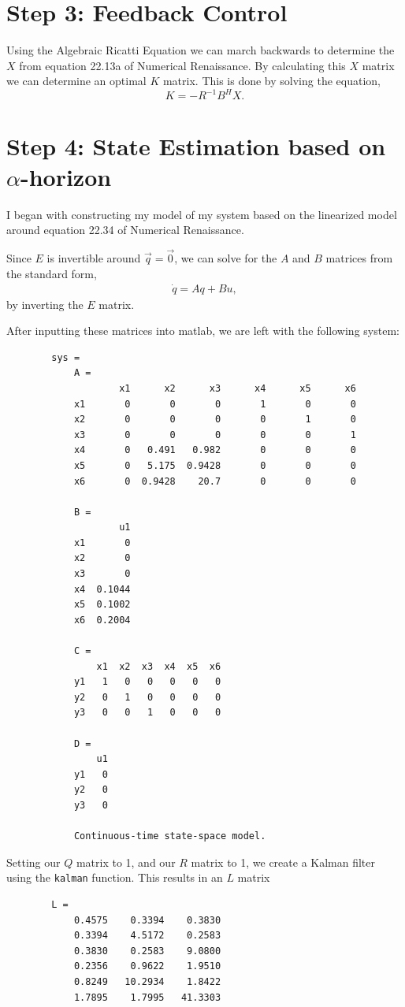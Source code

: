 \documentclass{article}
\theoremstyle{definition}
\begin{document}
    \section*{Step 3: Feedback Control}
    Using the Algebraic Ricatti Equation we can march backwards to determine the
    $X$ from equation 22.13a of Numerical Renaissance. By calculating this $X$ 
    matrix we can determine an optimal $K$ matrix. This is done by solving the
    equation,
    \begin{equation*}
        K = -R^{-1} B^H X.
    \end{equation*}

    \section*{Step 4: State Estimation based on $\alpha$-horizon}
    I began with constructing my model of my system based on the linearized
    model around equation 22.34 of Numerical Renaissance. 

    Since $E$ is invertible around $\vec q = \vec 0$, we can solve for 
    the $A$ and $B$ matrices from the standard form,
    \begin{eqnarray*}
        \dot q = A q + B u,
    \end{eqnarray*}
    by inverting the $E$ matrix. 

    After inputting these matrices into matlab, we are left with the following system:
    \begin{verbatim}
        sys =
            A = 
                    x1      x2      x3      x4      x5      x6
            x1       0       0       0       1       0       0
            x2       0       0       0       0       1       0
            x3       0       0       0       0       0       1
            x4       0   0.491   0.982       0       0       0
            x5       0   5.175  0.9428       0       0       0
            x6       0  0.9428    20.7       0       0       0
            
            B = 
                    u1
            x1       0
            x2       0
            x3       0
            x4  0.1044
            x5  0.1002
            x6  0.2004
            
            C = 
                x1  x2  x3  x4  x5  x6
            y1   1   0   0   0   0   0
            y2   0   1   0   0   0   0
            y3   0   0   1   0   0   0
            
            D = 
                u1
            y1   0
            y2   0
            y3   0
            
            Continuous-time state-space model.
    \end{verbatim}
    Setting our $Q$ matrix to 1, and our $R$ matrix to 1,
    we create a Kalman filter using the \texttt{kalman} function.
    This results in an $L$ matrix 
    \begin{verbatim}
        L =
            0.4575    0.3394    0.3830
            0.3394    4.5172    0.2583
            0.3830    0.2583    9.0800
            0.2356    0.9622    1.9510
            0.8249   10.2934    1.8422
            1.7895    1.7995   41.3303
    \end{verbatim}
\end{document}
